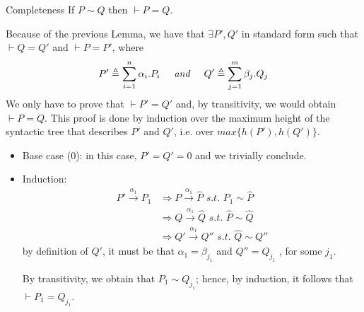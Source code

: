 \begin{Thm}{Completeness}{}
    If $P\sim Q$ then $\vdash P = Q$.
    \begin{demonstration}
        Because of the previous Lemma, we have that $\exists P', Q'$ in standard form such that $\vdash Q = Q'$ and $\vdash P = P'$, where
        \begin{equation*}
            P'\triangleq \sum_{i = 1}^n\alpha_i.P_i
            \hspace{.5cm}\textit{and}\hspace{.5cm}
            Q'\triangleq \sum_{j = 1}^m\beta_j.Q_j
        \end{equation*}
        We only have to prove that $\vdash P' = Q'$ and, by transitivity, we would obtain $\vdash P = Q$. This proof is done by induction over the maximum height of the syntactic tree that describes $P'$ and $Q'$, i.e. over $max\{h(P'), h(Q')\}$.
        \begin{itemize}
            \item Base case ($0$): in this case, $P' = Q' = 0$ and we trivially conclude.
            \item Induction:
            \begin{align*}
                P'\xrightarrow{\alpha_1}P_1 
                &\Rightarrow P\xrightarrow{\alpha_1}\widehat{P}\textit{ s.t. }P_1\sim \widehat{P}\\
                &\Rightarrow Q\xrightarrow{\alpha_1}\widehat{Q}\textit{ s.t. }\widehat{P}\sim \widehat{Q}\\
                &\Rightarrow Q'\xrightarrow{\alpha_1}Q''\textit{ s.t. }\widehat{Q}\sim Q''
            \end{align*}
            by definition of $Q'$, it must be that $\alpha_1 = \beta_{j_1}$ and $Q'' = Q_{j_1}$ , for some $j_1$.
            
            By transitivity, we obtain that $P_1\sim Q_{j_1}$; hence, by induction, it follows that $\vdash P_1 = Q_{j_1}$.
        \end{itemize}


\end{demonstration}
\end{Thm}
